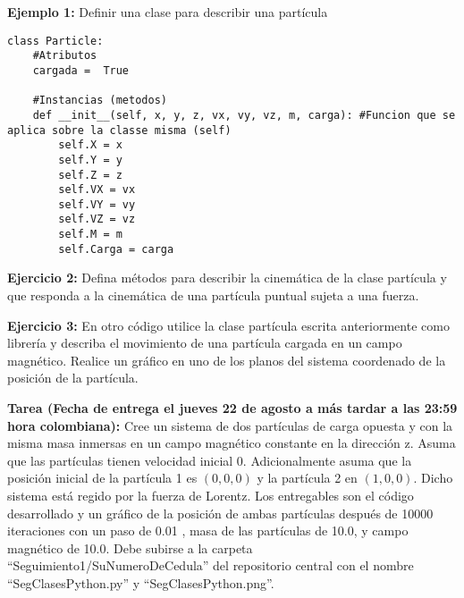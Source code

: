 \documentclass[10.5pt]{article}
\begin{document}
{\bf Ejemplo 1:} Definir una clase para describir una partícula
\begin{verbatim}
class Particle:
    #Atributos
    cargada =  True
    
    #Instancias (metodos)
    def __init__(self, x, y, z, vx, vy, vz, m, carga): #Funcion que se aplica sobre la classe misma (self)
        self.X = x
        self.Y = y
        self.Z = z
        self.VX = vx
        self.VY = vy
        self.VZ = vz
        self.M = m
        self.Carga = carga
\end{verbatim}

{\bf Ejercicio 2:} Defina métodos para describir la cinemática de la clase partícula y que responda a la cinemática de una partícula puntual sujeta a una fuerza.

{\bf Ejercicio 3:} En otro código utilice la clase partícula escrita anteriormente como librería y describa el movimiento de una partícula cargada en un campo magnético. Realice un gráfico en uno de los planos del sistema coordenado de la posición de la partícula.

{\bf Tarea (Fecha de entrega el jueves 22 de agosto a más tardar a las 23:59 hora colombiana):}  Cree un sistema de dos partículas de carga opuesta y con la misma masa inmersas en un campo magnético constante en la dirección z. Asuma que las partículas tienen velocidad inicial 0. Adicionalmente asuma que la posición inicial de la partícula 1 es $(0,0,0)$ y la partícula 2 en $(1,0,0)$. Dicho sistema está regido por la fuerza de Lorentz. Los entregables son el código desarrollado y un gráfico de la posición de ambas partículas después de 10000 iteraciones con un paso de 0.01 , masa de las partículas de 10.0, y campo magnético de 10.0. Debe subirse a la carpeta ``Seguimiento1/SuNumeroDeCedula'' del repositorio central con el nombre ``SegClasesPython.py'' y ``SegClasesPython.png''.





%
\end{document}
